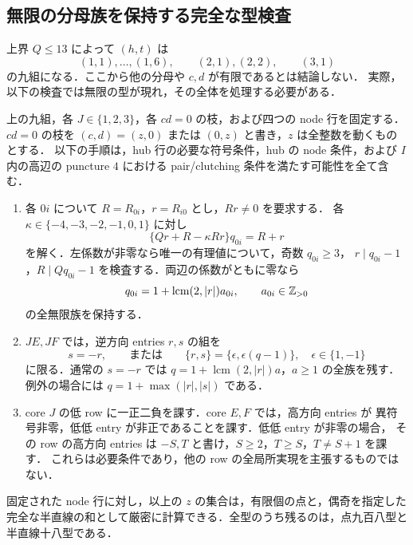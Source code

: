 \subsection{無限の分母族を保持する完全な型検査}

上界 $Q\le13$ によって $(h,t)$ は
\[
 (1,1),\ldots,(1,6),\qquad (2,1),(2,2),\qquad (3,1)
\]
の九組になる．ここから他の分母や $c,d$ が有限であるとは結論しない．
実際，以下の検査では無限の型が現れ，その全体を処理する必要がある．

\begin{lemma}
\label{dl19:finite-types}
上の九組，各 $J\in\{1,2,3\}$，各 $cd=0$ の枝，および四つの node 行を固定する．
$cd=0$ の枝を $(c,d)=(z,0)$ または $(0,z)$ と書き，$z$ は全整数を動くものとする．
以下の手順は，hub 行の必要な符号条件，hub の node 条件，および
$I$ 内の高辺の puncture $4$ における pair/clutching 条件を満たす可能性を全て含む．
\begin{enumerate}
\item 各 $0i$ について $R=R_{0i}$，$r=R_{i0}$ とし，$Rr\ne0$ を要求する．
各 $\kappa\in\{-4,-3,-2,-1,0,1\}$ に対し
\[
 \{Qr+R-\kappa Rr\}q_{0i}=R+r
\]
を解く．左係数が非零なら唯一の有理値について，奇数 $q_{0i}\ge3$，
$r\mid q_{0i}-1$，$R\mid Qq_{0i}-1$ を検査する．両辺の係数がともに零なら
\[
 q_{0i}=1+\operatorname{lcm}(2,|r|)a_{0i},\qquad a_{0i}\in\mathbb Z_{>0}
\]
の全無限族を保持する．
\item $JE,JF$ では，逆方向 entries $r,s$ の組を
\[
 s=-r,\qquad\text{または}\qquad
 \{r,s\}=\{\epsilon,\epsilon(q-1)\},\quad\epsilon\in\{1,-1\}
\]
に限る．通常の $s=-r$ では $q=1+\operatorname{lcm}(2,|r|)a$，$a\ge1$ の全族を残す．
例外の場合には $q=1+\max(|r|,|s|)$ である．
\item core $J$ の低 row に一正二負を課す．core $E,F$ では，高方向 entries が
異符号非零，低低 entry が非正であることを課す．低低 entry が非零の場合，
その row の高方向 entries は $-S,T$ と書け，$S\ge2$，$T\ge S$，$T\ne S+1$ を課す．
これらは必要条件であり，他の row の全局所実現を主張するものではない．
\end{enumerate}
固定された node 行に対し，以上の $z$ の集合は，有限個の点と，偶奇を指定した
完全な半直線の和として厳密に計算できる．全型のうち残るのは，点九百八型と半直線十八型である．
\end{lemma}

